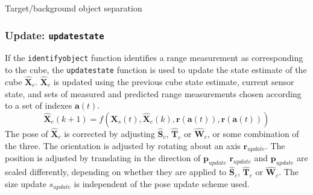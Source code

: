 		\IncMargin{2em}
		\begin{algorithm}
		\DontPrintSemicolon
	
		\caption{Target/background object separation} \label{alg:object}
		\end{algorithm}
		
	\subsubsection{Update: \texttt{updatestate}} 
		If the \texttt{identifyobject} function identifies a range measurement as corresponding to the cube, the \texttt{updatestate} function is used to update the state estimate of the cube $\hat{\mathbf{X}}_c$. $\hat{\mathbf{X}}_c$ is updated using the previous cube state estimate, current sensor state, and sets of measured and predicted range measurements chosen according to a set of indexes $\mathbf{a}(t)$. 
		\begin{equation}
			\hat{\mathbf{X}}_{c}(k+1) = f(\mathbf{X}_{s}(t),\hat{\mathbf{X}}_{c}(k),\mathbf{r}(\mathbf{a}(t)),\hat{\mathbf{r}}(\mathbf{a}(t)))
		\end{equation}	
		The pose of $\hat{\mathbf{X}}_c$ is corrected by adjusting $\hat{\mathbf{S}}_c$, $\hat{\mathbf{T}}_c$ or $\hat{\mathbf{W}}_c$, or some combination of the three.
		The orientation is adjusted by rotating  about an axis $\mathbf{r}_{update}$. The position is adjusted by translating in the direction of $\mathbf{p}_{update}$
		$\mathbf{r}_{update}$ and $\mathbf{p}_{update}$ are scaled differently, depending on whether they are applied to $\hat{\mathbf{S}}_c$, $\hat{\mathbf{T}}_c$ or $\hat{\mathbf{W}}_c$.
		The size update $s_{update}$ is independent of the pose update scheme used.
		
